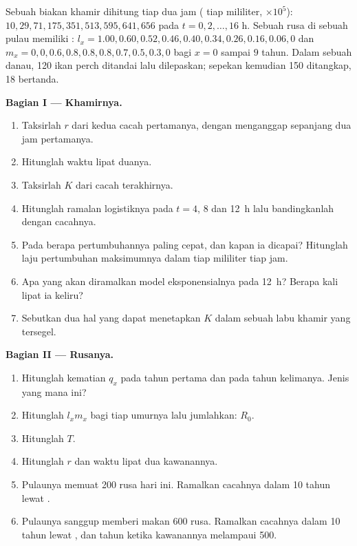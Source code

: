\begin{problem}
\label{pb:b1:populations:1}
Sebuah biakan khamir dihitung tiap dua jam ( tiap mililiter,
$\times 10^5$): $10, 29, 71, 175, 351, 513, 595, 641, 656$ pada $t = 0,
2, \ldots, 16$ h. Sebuah  rusa di sebuah pulau memiliki : $l_x = 1.00, 0.60, 0.52, 0.46, 0.40, 0.34, 0.26, 0.16, 0.06, 0$ dan
$m_x = 0, 0, 0.6, 0.8, 0.8, 0.8, 0.7, 0.5, 0.3, 0$ bagi $x = 0$ sampai $9$
tahun. Dalam sebuah danau, 120 ikan perch ditandai lalu dilepaskan;
sepekan kemudian 150 ditangkap, 18 bertanda.

\medskip
\noindent\textbf{Bagian I --- Khamirnya.}
\begin{enumerate}
  \item Taksirlah $r$ dari kedua cacah pertamanya, dengan menganggap
         sepanjang dua jam pertamanya.
  \item Hitunglah waktu lipat duanya.
  \item Taksirlah $K$ dari cacah terakhirnya.
  \item Hitunglah ramalan logistiknya pada $t = 4$, $8$ dan \qty{12}{h}
        lalu bandingkanlah dengan cacahnya.
  \item Pada  berapa pertumbuhannya paling cepat, dan kapan ia
        dicapai? Hitunglah laju pertumbuhan maksimumnya dalam  tiap
        mililiter tiap jam.
  \item Apa yang akan diramalkan model eksponensialnya pada
        \qty{12}{h}? Berapa kali lipat ia keliru?
  \item Sebutkan dua hal yang dapat menetapkan $K$ dalam sebuah labu
        khamir yang tersegel.
\end{enumerate}

\medskip
\noindent\textbf{Bagian II --- Rusanya.}
\begin{enumerate}[resume]
  \item Hitunglah kematian $q_x$ pada tahun pertama dan pada tahun
        kelimanya. Jenis  yang mana ini?
  \item Hitunglah $l_x m_x$ bagi tiap umurnya lalu jumlahkan: $R_0$.
  \item Hitunglah $T$.
  \item Hitunglah $r$ dan waktu lipat dua kawanannya.
  \item Pulaunya memuat 200 rusa hari ini. Ramalkan cacahnya dalam 10
        tahun lewat .
  \item Pulaunya sanggup memberi makan 600 rusa. Ramalkan cacahnya
        dalam 10 tahun lewat , dan tahun ketika
        kawanannya melampaui 500.
\end{enumerate}


\end{problem}
